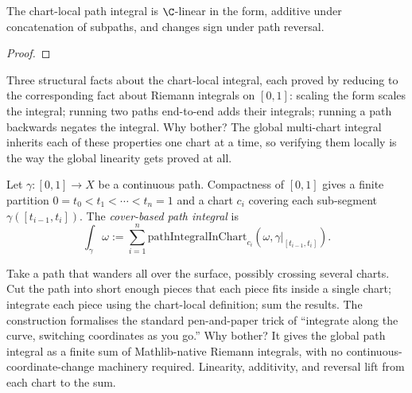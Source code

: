 \begin{lemma}
\label{lem:path-integral-in-chart-linearity}
The chart-local path integral is \(\C\)-linear in the form, additive
under concatenation of subpaths, and changes sign under path
reversal.
\leanok
\end{lemma}
\begin{proof}\leanok\end{proof}

\begin{layman}
Three structural facts about the chart-local integral, each proved
by reducing to the corresponding fact about Riemann integrals on
\([0,1]\): scaling the form scales the integral; running two paths
end-to-end adds their integrals; running a path backwards negates
the integral. Why bother? The global multi-chart integral inherits
each of these properties one chart at a time, so verifying them
locally is the way the global linearity gets proved at all.
\end{layman}

\begin{definition}
\label{def:path-integral-via-cover}
Let \(\gamma:[0,1]\to X\) be a continuous path. Compactness of
\([0,1]\) gives a finite partition
\(0=t_0<t_1<\cdots<t_n=1\) and a chart \(c_i\) covering each
sub-segment \(\gamma([t_{i-1},t_i])\). The \emph{cover-based path
integral} is
\[
  \int_\gamma \omega
    := \sum_{i=1}^{n}
       \mathrm{pathIntegralInChart}_{c_i}(\omega,\gamma|_{[t_{i-1},t_i]}).
\]
\leanok
\end{definition}

\begin{layman}
Take a path that wanders all over the surface, possibly crossing
several charts. Cut the path into short enough pieces that each
piece fits inside a single chart; integrate each piece using the
chart-local definition; sum the results. The construction
formalises the standard pen-and-paper trick of ``integrate along
the curve, switching coordinates as you go.'' Why bother? It gives
the global path integral as a finite sum of Mathlib-native
Riemann integrals, with no continuous-coordinate-change machinery
required. Linearity, additivity, and reversal lift from each chart
to the sum.
\end{layman}

